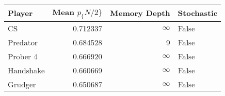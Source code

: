 \begin{tabular}{lrrl}
\toprule
    Player &  Mean $p_\{N/2\}$ &  Memory Depth & Stochastic \\
\midrule
        CS &        0.712337 &            \(\infty\) &      False \\
  Predator &        0.684528 &             9 &      False \\
  Prober 4 &        0.666920 &            \(\infty\) &      False \\
 Handshake &        0.660669 &            \(\infty\) &      False \\
   Grudger &        0.650687 &            \(\infty\) &      False \\
\bottomrule
\end{tabular}

